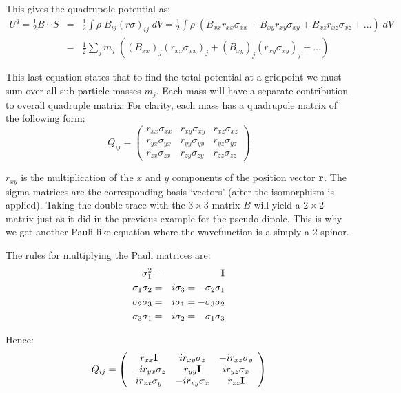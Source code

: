 \noindent This gives the quadrupole potential as:
\begin{eqnarray}
U^q = \frac{1}{2} B\cdot\cdot S &=& \frac{1}{2}\int \rho\; B_{ij} (r \sigma)_{ij} \;dV = \frac{1}{2}\int \rho\; (B_{xx} r_{xx}\sigma_{xx} + B_{xy} r_{xy}\sigma_{xy} + B_{xz} r_{xz}\sigma_{xz} + \ldots) \;dV \nonumber \\
&=& \frac{1}{2}\sum_j m_j \; ( (B_{xx})_j (r_{xx}\sigma_{xx})_j + (B_{xy})_j (r_{xy}\sigma_{xy})_j + \ldots)
\end{eqnarray}

\noindent This last equation states that to find the total potential at a gridpoint we must sum over all sub-particle masses $m_j$. Each mass will have a separate contribution to overall quadruple matrix. For clarity, each mass has a quadrupole matrix of the following form:
\begin{equation}
Q_{ij} =
\left(\begin{array}{ccc}
r_{xx}\sigma_{xx} & r_{xy}\sigma_{xy} & r_{xz}\sigma_{xz} \\
r_{yx}\sigma_{yx} & r_{yy}\sigma_{yy} & r_{yz}\sigma_{yz} \\
r_{zx}\sigma_{zx} & r_{zy}\sigma_{zy} & r_{zz}\sigma_{zz}
\end{array}\right)
\end{equation}

\noindent $r_{xy}$ is the multiplication of the $x$ and $y$ components of the position vector ${\bf r}$. The sigma matrices are the corresponding basis `vectors' (after the isomorphism is applied). Taking the double trace with the $3 \times 3$ matrix $B$ will yield a $2 \times 2$ matrix just as it did in the previous example for the pseudo-dipole. This is why we get another Pauli-like equation where the wavefunction is a simply a 2-spinor.

The rules for multiplying the Pauli matrices \citep{bib_lou} are:
\begin{eqnarray}
\sigma_1^2 &=& {\bf I} \\
\sigma_1\sigma_2 &=& i\sigma_3 = -\sigma_2\sigma_1 \\
\sigma_2\sigma_3 &=& i\sigma_1 = -\sigma_3\sigma_2 \\
\sigma_3\sigma_1 &=& i\sigma_2 = -\sigma_1\sigma_3
\end{eqnarray}

\noindent Hence:
\begin{equation}
Q_{ij} = 
\left(\begin{array}{ccc}
r_{xx} {\bf I} & i r_{xy}\sigma_{z} & -i r_{xz}\sigma_{y} \\
-i r_{yx}\sigma_{z} & r_{yy} {\bf I} & i r_{yz}\sigma_{x} \\
i r_{zx}\sigma_{y} & -i r_{zy}\sigma_{x} & r_{zz} {\bf I}
\end{array}\right)
\end{equation}

